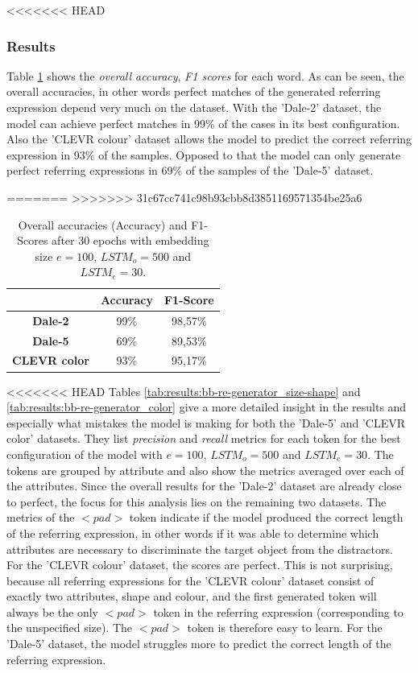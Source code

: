 \documentclass[11pt]{article}
\begin{document}
<<<<<<< HEAD
\subsubsection*{Results}
Table \ref{tab:results:bb-re-generator} shows the \emph{overall accuracy}, \emph{F1 scores} for each word.
As can be seen, the overall accuracies, in other words perfect matches of the generated referring expression depend very much on the dataset.
With the 'Dale-2' dataset, the model can achieve perfect matches in 99\% of the cases in its best configuration.
Also the 'CLEVR colour' dataset allows the model to predict the correct referring expression in 93\% of the samples.
Opposed to that the model can only generate perfect referring expressions in 69\% of the samples of the 'Dale-5' dataset.

=======
>>>>>>> 31c67cc741c98b93cbb8d3851169571354be25a6
\begin{table}[ht]
        \centering
        \begin{tabular}{c|cc}
                \toprule
                                     & \textbf{Accuracy} & \textbf{F1-Score} \\\midrule
                \textbf{Dale-2}      & 99\%              & 98,57\%           \\
                \textbf{Dale-5}      & 69\%              & 89,53\%           \\
                \textbf{CLEVR color} & 93\%              & 95,17\%           \\
                \bottomrule
        \end{tabular}
        \caption{Overall accuracies (Accuracy) and F1-Scores after 30 epochs with embedding size $e=100$, $LSTM_o=500$ and $LSTM_e=30$.}
        \label{tab:results:bb-re-generator}
\end{table}

<<<<<<< HEAD
Tables \ref{tab:results:bb-re-generator_size-shape} and \ref{tab:results:bb-re-generator_color} give a more detailed insight in the results and especially what mistakes the model is making for both the 'Dale-5' and 'CLEVR color' datasets.
They list \emph{precision} and \emph{recall} metrics for each token for the best configuration of the model with $e=100$, $LSTM_o=500$ and $LSTM_e=30$.
The tokens are grouped by attribute and also show the metrics averaged over each of the attributes.
Since the overall results for the 'Dale-2' dataset are already close to perfect, the focus for this analysis lies on the remaining two datasets.
The metrics of the \emph{$<pad>$} token indicate if the model produced the correct length of the referring expression, in other words if it was able to determine which attributes are necessary to discriminate the target object from the distractors.
For the 'CLEVR colour' dataset, the scores are perfect.
This is not surprising, because all referring expressions for the 'CLEVR colour' dataset consist of exactly two attributes, shape and colour, and the first generated token will always be the only \emph{$<pad>$} token in the referring expression (corresponding to the unspecified size).
The \emph{$<pad>$} token is therefore easy to learn.
For the 'Dale-5' dataset, the model struggles more to predict the correct length of the referring expression.
\end{document}
